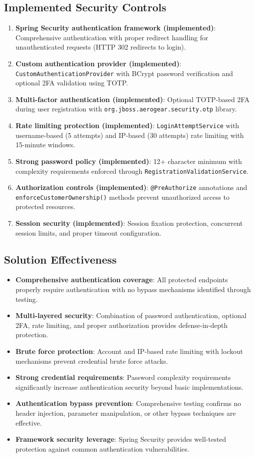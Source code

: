 \documentclass[]{UCD_CS_FYP_Report}
\begin{document}
\subsection{Implemented Security Controls}
\begin{enumerate}
	\item \textbf{Spring Security authentication framework (implemented)}: Comprehensive authentication with proper redirect handling for unauthenticated requests (HTTP 302 redirects to login).
	\item \textbf{Custom authentication provider (implemented)}: \texttt{CustomAuthenticationProvider} with BCrypt password verification and optional 2FA validation using TOTP.
	\item \textbf{Multi-factor authentication (implemented)}: Optional TOTP-based 2FA during user registration with \texttt{org.jboss.aerogear.security.otp} library.
	\item \textbf{Rate limiting protection (implemented)}: \texttt{LoginAttemptService} with username-based (5 attempts) and IP-based (30 attempts) rate limiting with 15-minute windows.
	\item \textbf{Strong password policy (implemented)}: 12+ character minimum with complexity requirements enforced through \texttt{RegistrationValidationService}.
	\item \textbf{Authorization controls (implemented)}: \texttt{@PreAuthorize} annotations and \texttt{enforceCustomerOwnership()} methods prevent unauthorized access to protected resources.
	\item \textbf{Session security (implemented)}: Session fixation protection, concurrent session limits, and proper timeout configuration.
\end{enumerate}

\subsection{Solution Effectiveness}
\begin{itemize}
	\item \textbf{Comprehensive authentication coverage}: All protected endpoints properly require authentication with no bypass mechanisms identified through testing.
	\item \textbf{Multi-layered security}: Combination of password authentication, optional 2FA, rate limiting, and proper authorization provides defense-in-depth protection.
	\item \textbf{Brute force protection}: Account and IP-based rate limiting with lockout mechanisms prevent credential brute force attacks.
	\item \textbf{Strong credential requirements}: Password complexity requirements significantly increase authentication security beyond basic implementations.
	\item \textbf{Authentication bypass prevention}: Comprehensive testing confirms no header injection, parameter manipulation, or other bypass techniques are effective.
	\item \textbf{Framework security leverage}: Spring Security provides well-tested protection against common authentication vulnerabilities.
\end{itemize}
\end{document}
